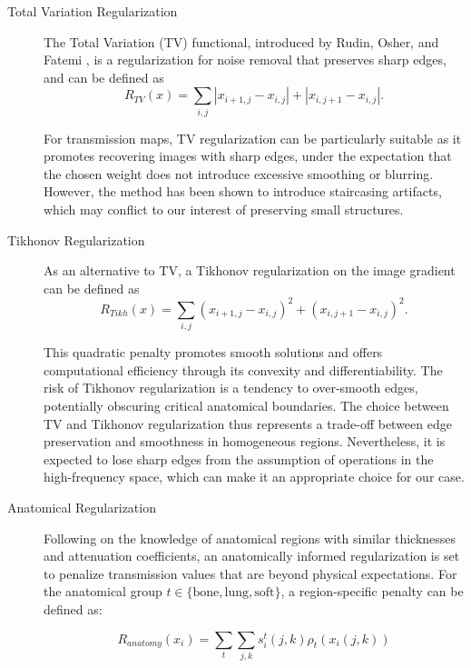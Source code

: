 \documentclass[nomenclature, english, bibtex]{kththesis}
\numberwithin{listing}{chapter}
\begin{document}
\begin{description}
    \item[Total Variation Regularization] The Total Variation (TV) functional, introduced by Rudin, Osher, and Fatemi \cite{rudinNonlinearTotalVariation1992},
    is a regularization for noise removal that preserves sharp edges, and can be defined as
      \begin{equation}
        R_{TV}(x) = \sum_{i,j} |x_{i+1,j} - x_{i,j}| + |x_{i,j+1} - x_{i,j}|.
    \end{equation}

    For transmission maps, TV regularization can be particularly suitable as it promotes recovering images with sharp edges,
    under the expectation that the chosen weight does not introduce excessive smoothing or blurring. However, the method has been shown
    to introduce staircasing artifacts, which may conflict to our interest of preserving small structures.

    \item[Tikhonov Regularization] As an alternative to TV, a Tikhonov regularization on the image gradient can be defined as
    \begin{equation}
        R_{Tikh}(x) = \sum_{i,j} (x_{i+1,j} - x_{i,j})^2 + (x_{i,j+1} - x_{i,j})^2.
    \end{equation}

    This quadratic penalty promotes smooth solutions and offers computational efficiency through its convexity and differentiability.
    The risk of Tikhonov regularization is a tendency to over-smooth edges, potentially obscuring critical anatomical boundaries.
    The choice between TV and Tikhonov regularization thus represents a trade-off between edge preservation
    and smoothness in homogeneous regions. Nevertheless, it is expected to lose sharp edges from the assumption of operations
    in the high-frequency space, which can make it an appropriate choice for our case.

    \item[Anatomical Regularization] Following on the knowledge of anatomical regions with similar thicknesses
    and attenuation coefficients, an anatomically informed regularization is set to penalize transmission values that are beyond
    physical expectations. For the anatomical group $t \in \{\text{bone}, \text{lung}, \text{soft}\}$,
    a region-specific penalty can be defined as:

    \begin{equation}
        R_{anatomy}(x_i) = \sum_{t} \sum_{j,k} s_i^t(j, k) \rho_t(x_i(j,k))
    \end{equation}


\end{description}
\end{document}
